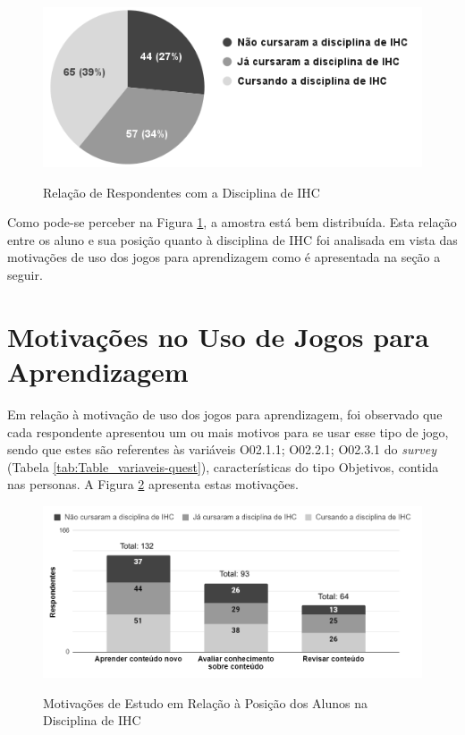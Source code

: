 \begin{figure}[htbp]
	\centering
	\caption{Relação de Respondentes com a Disciplina de IHC}
	\includegraphics[keepaspectratio=true,scale=0.65]{figuras/resultados/rel-disc-ihc.png}
	\label{Fig:rel-disc-ihc.png}
\end{figure}

Como pode-se perceber na Figura \ref{Fig:rel-disc-ihc.png}, a amostra está bem distribuída. Esta relação entre os aluno e sua posição quanto à disciplina de IHC foi analisada em vista das motivações de uso dos jogos para aprendizagem como é apresentada na seção a seguir. 

\section{Motivações no Uso de Jogos para Aprendizagem}
\label{sec:mot-uso}

Em relação à motivação de uso dos jogos para aprendizagem, foi observado que cada respondente apresentou um ou mais motivos para se usar esse tipo de jogo, sendo que estes são referentes às variáveis O02.1.1; O02.2.1; O02.3.1 do \textit{survey} (Tabela \ref{tab:Table_variaveis-quest}), características do tipo Objetivos, contida nas personas. A Figura \ref{Fig:rel-disc-obj.png} apresenta estas motivações.

\begin{figure}[htbp]
	\centering
	\caption{Motivações de Estudo em Relação à Posição dos Alunos na Disciplina de IHC}
	\includegraphics[keepaspectratio=true,scale=0.675]{figuras/resultados/rel-disc-obj.png}
	\label{Fig:rel-disc-obj.png}
\end{figure}

